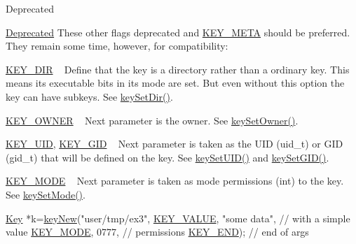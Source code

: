 \begin{DoxyRefDesc}{Deprecated}
\item[\hyperlink{deprecated__deprecated000008}{Deprecated}]These other flags deprecated and \hyperlink{group__key_gga91fb3178848bd682000958089abbaf40a040582834bb2d90049947d7ef74e87e2}{K\+E\+Y\+\_\+\+M\+E\+T\+A} should be preferred. They remain some time, however, for compatibility\+:
\begin{DoxyItemize}
\item \hyperlink{group__key_gga91fb3178848bd682000958089abbaf40a9e43e47c8a21478538e2d20e049981d5}{K\+E\+Y\+\_\+\+D\+I\+R} ~\newline
 Define that the key is a directory rather than a ordinary key. This means its executable bits in its mode are set. But even without this option the key can have subkeys. See \hyperlink{group__meta_gaae575bd86a628a15ee45baa860522e75}{key\+Set\+Dir()}.
\item \hyperlink{group__key_gga91fb3178848bd682000958089abbaf40a77ca60362fa8daca8d5347db4385068b}{K\+E\+Y\+\_\+\+O\+W\+N\+E\+R} ~\newline
 Next parameter is the owner. See \hyperlink{group__meta_ga88d6ec200ba0707b7c1b4a88133d2be4}{key\+Set\+Owner()}.
\item \hyperlink{group__key_gga91fb3178848bd682000958089abbaf40a28f01a87d65f065172f734c9c9446c0e}{K\+E\+Y\+\_\+\+U\+I\+D}, \hyperlink{group__key_gga91fb3178848bd682000958089abbaf40ac0628bbaba7c837ca73323681393d15f}{K\+E\+Y\+\_\+\+G\+I\+D} ~\newline
 Next parameter is taken as the U\+I\+D (uid\+\_\+t) or G\+I\+D (gid\+\_\+t) that will be defined on the key. See \hyperlink{group__meta_gab5f284f5ecd261e0a290095f50ba1af7}{key\+Set\+U\+I\+D()} and \hyperlink{group__meta_ga9e3d0fb3f7ba906e067727b9155d22e3}{key\+Set\+G\+I\+D()}.
\item \hyperlink{group__key_gga91fb3178848bd682000958089abbaf40a1b0a91ff3a855d6993930ebf0abaa518}{K\+E\+Y\+\_\+\+M\+O\+D\+E} ~\newline
 Next parameter is taken as mode permissions (int) to the key. See \hyperlink{group__meta_ga8803037e35b9da1ce492323a88ff6bc3}{key\+Set\+Mode()}. 
\begin{DoxyCodeInclude}
\hyperlink{classkdb_1_1Key_a5679f5cae63caddd64a60388b9cc77fa}{Key} *k=\hyperlink{group__key_gad23c65b44bf48d773759e1f9a4d43b89}{keyNew}(\textcolor{stringliteral}{"user/tmp/ex3"},
        \hyperlink{group__key_gga91fb3178848bd682000958089abbaf40ac66e4a49d09212b79f5754ca6db5bd2e}{KEY\_VALUE}, \textcolor{stringliteral}{"some data"},    \textcolor{comment}{// with a simple value}
        \hyperlink{group__key_gga91fb3178848bd682000958089abbaf40a1b0a91ff3a855d6993930ebf0abaa518}{KEY\_MODE}, 0777,            \textcolor{comment}{// permissions}
        \hyperlink{group__key_gga91fb3178848bd682000958089abbaf40aa8adb6fcb92dec58fb19410eacfdd403}{KEY\_END});                  \textcolor{comment}{// end of args}
\end{DoxyCodeInclude}


\end{DoxyItemize}
\end{DoxyRefDesc}
